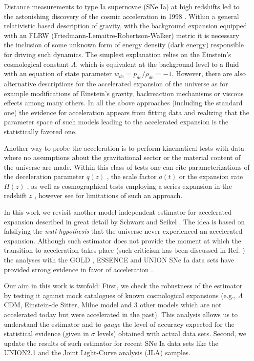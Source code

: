 \documentclass[nofootinbib,twocolumn]{revtex4}
\begin{document}
Distance measurements to type Ia supernovae (SNe Ia) at high redshifts led to the astonishing discovery of the cosmic acceleration in 1998 \cite{Perlmutter:1998np,Riess:1998cb}. Within a general relativistic based description of gravity, with the background expansion equipped with an FLRW (Friedmann-Lemaitre-Robertson-Walker) metric it is necessary the inclusion of some unknown form of energy density (dark energy) responsible for driving such dynamics. The simplest explanation relies on the Einstein's cosmological constant $\Lambda$, which is equivalent at the background level to a fluid with an equation of state parameter $w_{de}=p_{de}/\rho_{de}=-1$. However, there are also alternative descriptions for the accelerated expansion of the universe as for example modifications of Einstein's gravity, backreaction mechanisms or viscous effects among many others. In all the above approaches (including the standard one) the evidence for acceleration appears from fitting data and realizing that the parameter space of such models leading to the accelerated expansion is the statistically favored one. 

Another way to probe the acceleration is to perform kinematical tests with data where no assumptions about the gravitational sector or the material content of the universe are made. Within this class of tests one can cite parameterizations of the deceleration parameter $q(z)$ \cite{Elgaroy:2006tp,
Shafieloo:2009ti}, the scale factor $a(t)$ \cite{Wang:2005yaa} or the expansion rate $H(z)$ \cite{John:2005bz,Nair:2012bs}, as well as cosmographical tests employing a series expansion in the redshift $z$ \cite{review_cosmography,Luongo:2015zgq,cosm16}, however see \cite{busti2015} for limitations of such an approach. 

In this work we revisit another model-independent estimator for accelerated expansion described in great detail by Schwarz and Seikel \cite{Seikel:2007pk,Seikel:2008ms}. The idea is based on falsifying the {\it null hypothesis} that the universe never experienced an accelerated expansion. Although such estimator does not provide the moment at which the transition to acceleration takes place (such criticism has been discussed in Ref. \cite{Mortsell:2008yu}) the analyses with the GOLD 
\cite{Riess:2006fw}, ESSENCE\cite{WoodVasey:2007jb} and UNION \cite{Kowalski:2008ez} SNe Ia data sets have provided strong evidence in favor of acceleration \cite{Seikel:2007pk,Seikel:2008ms}. 

Our aim in this work is twofold: First, we check the robustness of the estimator by testing it against mock catalogues of known cosmological expansions (e.g., $\Lambda$CDM, Einstein-de Sitter, Milne model and 3 other models which are not accelerated today but were accelerated in the past). This analysis allows us to understand the estimator and to {\it gauge} the level of accuracy expected for the statistical evidence (given in $\sigma$ levels) obtained with actual data sets. Second, we update the results of such estimator for recent SNe Ia data sets like the UNION2.1 \cite{Suzuki:2011hu} and the Joint Light-Curve analysis (JLA) \cite{Betoule:2014frx} samples. 
\end{document}
